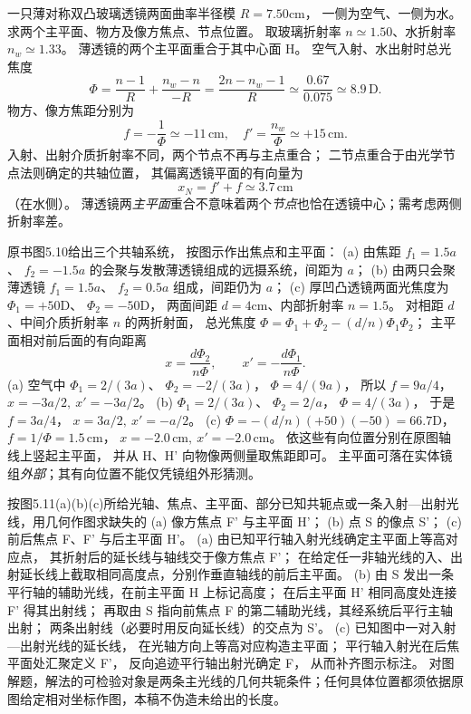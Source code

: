 一只薄对称双凸玻璃透镜两面曲率半径模
$R=7.50$cm，
一侧为空气、一侧为水。
求两个主平面、物方及像方焦点、节点位置。
取玻璃折射率 $n\simeq1.50$、水折射率
$n_w\simeq1.33$。
\exsolution
薄透镜的两个主平面重合于其中心面 H。
空气入射、水出射时总光焦度
\[
\Phi=\frac{n-1}R+\frac{n_w-n}{-R}
=\frac{2n-n_w-1}{R}
\simeq\frac{0.67}{0.075}
\simeq8.9\,\mathrm D.
\]
物方、像方焦距分别为
\[
\boxed{f=-\frac1\Phi\simeq-11\,\mathrm{cm}},
\quad
\boxed{f'=\frac{n_w}{\Phi}\simeq+15\,\mathrm{cm}}.
\]
入射、出射介质折射率不同，两个节点不再与主点重合；
二节点重合于由光学节点法则确定的共轴位置，
其偏离透镜平面的有向量为
\[
\boxed{x_N=f'+f\simeq3.7\,\mathrm{cm}}
\]
（在水侧）。
\excheck 薄透镜两\emph{主平面}重合不意味着两个\emph{节点}也恰在透镜中心；需考虑两侧折射率差。

原书图5.10给出三个共轴系统，
按图示作出焦点和主平面：
(a) 由焦距 $f_1=1.5a$、
$f_2=-1.5a$ 的会聚与发散薄透镜组成的远摄系统，间距为 $a$；
(b) 由两只会聚薄透镜
$f_1=1.5a$、
$f_2=0.5a$ 组成，间距仍为 $a$；
(c) 厚凹凸透镜两面光焦度为
$\Phi_1=+50$D、
$\Phi_2=-50$D，
两面间距 $d=4$cm、内部折射率 $n=1.5$。
\exsolution
对相距 $d$、中间介质折射率 $n$ 的两折射面，
总光焦度
$\Phi=\Phi_1+\Phi_2-(d/n)\Phi_1\Phi_2$；
主平面相对前后面的有向距离
\[
\boxed{x=\frac{d\Phi_2}{n\Phi}},\qquad
\boxed{x'=-\frac{d\Phi_1}{n\Phi}}.
\]
(a) 空气中
$\Phi_1=2/(3a)$、
$\Phi_2=-2/(3a)$，
$\Phi=4/(9a)$，
所以
$\boxed{f=9a/4}$，
$\boxed{x=-3a/2,\ x'=-3a/2}$。
(b)
$\Phi_1=2/(3a)$、
$\Phi_2=2/a$，
$\Phi=4/(3a)$，
于是
$\boxed{f=3a/4}$，
$\boxed{x=3a/2,\ x'=-a/2}$。
(c)
$\Phi=-(d/n)(+50)(-50)=66.7$D，
$\boxed{f=1/\Phi=1.5\,\mathrm{cm}}$，
$\boxed{x=-2.0\,\mathrm{cm},\ x'=-2.0\,\mathrm{cm}}$。
依这些有向位置分别在原图轴线上竖起主平面，
并从 H、H' 向物像两侧量取焦距即可。
\excheck 主平面可落在实体镜组\emph{外部}；其有向位置不能仅凭镜组外形猜测。

按图5.11(a)(b)(c)所给光轴、焦点、主平面、部分已知共轭点或一条入射—出射光线，用几何作图求缺失的
(a) 像方焦点 F' 与主平面 H'；
(b) 点 S 的像点 S'；
(c) 前后焦点 F、F' 与后主平面 H'。
\exsolution
(a) 由已知平行轴入射光线确定主平面上等高对应点，
其折射后的延长线与轴线交于像方焦点 F'；
在给定任一非轴光线的入、出射延长线上截取相同高度点，分别作垂直轴线的前后主平面。
(b) 由 S 发出一条平行轴的辅助光线，在前主平面 H 上标记高度；
在后主平面 H' 相同高度处连接 F' 得其出射线；
再取由 S 指向前焦点 F 的第二辅助光线，其经系统后平行主轴出射；
两条出射线（必要时用反向延长线）的交点为 S'。
(c) 已知图中一对入射—出射光线的延长线，
在光轴方向上等高对应构造主平面；
平行轴入射光在后焦平面处汇聚定义 F'，
反向追迹平行轴出射光确定 F，
从而补齐图示标注。
\excheck 对图解题，解法的可检验对象是两条主光线的几何共轭条件；任何具体位置都须依据原图给定相对坐标作图，本稿不伪造未给出的长度。

